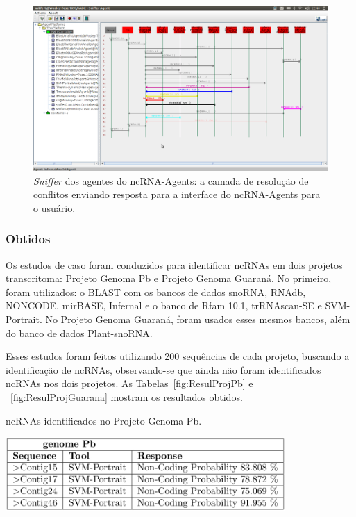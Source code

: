 \begin{landscape}
\begin{figure}[htb!]
\centering
\includegraphics[angle=0,width=1.5\textwidth]{imagens//FinalExe.png}
\caption{\textit{Sniffer} dos agentes do ncRNA-Agents: a camada de resolução de conflitos enviando resposta para a interface do ncRNA-Agents para o usuário.\label{sec:TelaFinalExec}}
\end{figure}
\end{landscape}



\newpage
\subsubsection*{Obtidos} \label{sec:Resulobtidos}

Os estudos de caso foram conduzidos para identificar ncRNAs em dois projetos transcritoma: Projeto Genoma Pb e Projeto Genoma Guaraná. No primeiro, foram utilizados: o BLAST com os bancos de dados snoRNA, RNAdb, NONCODE, mirBASE, Infernal e o banco de Rfam 10.1, trRNAscan-SE e SVM-Portrait. No Projeto Genoma Guaraná, foram usados esses mesmos bancos, além do banco de dados Plant-snoRNA.

Esses estudos foram feitos utilizando 200 sequências de cada projeto, buscando a identificação de ncRNAs, observando-se que ainda não foram identificados ncRNAs nos dois projetos. As Tabelas~\ref{fig:ResulProjPb} e ~\ref{fig:ResulProjGuarana} mostram os resultados obtidos.


\begin{table}[htb!]
\caption{ncRNAs identificados no Projeto Genoma Pb.} \label{fig:ResulProjPb}
\centering
\includegraphics[angle=0,width=0.8\textwidth]{imagens//fig2.JPEG} %
\end{table}


